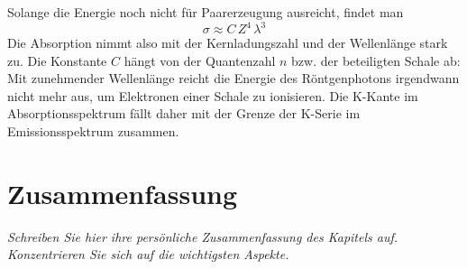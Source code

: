 Solange die Energie noch nicht für Paarerzeugung ausreicht, findet man
\begin{equation}
    \sigma \approx C \, Z^4 \, \lambda^3
\end{equation}
Die Absorption nimmt also mit der Kernladungszahl und der Wellenlänge stark zu. Die Konstante $C$ hängt von der Quantenzahl $n$ bzw. der beteiligten Schale ab: Mit zunehmender Wellenlänge reicht die Energie des Röntgenphotons irgendwann nicht mehr aus, um Elektronen einer Schale zu ionisieren. Die K-Kante im Absorptionsspektrum fällt daher mit der Grenze der K-Serie im Emissionsspektrum zusammen.



\section{Zusammenfassung}

\textit{Schreiben Sie hier ihre persönliche Zusammenfassung des Kapitels auf. Konzentrieren Sie sich auf die wichtigsten Aspekte.}

\vspace*{10cm}


\printbibliography[segment=\therefsegment,heading=subbibliography]
